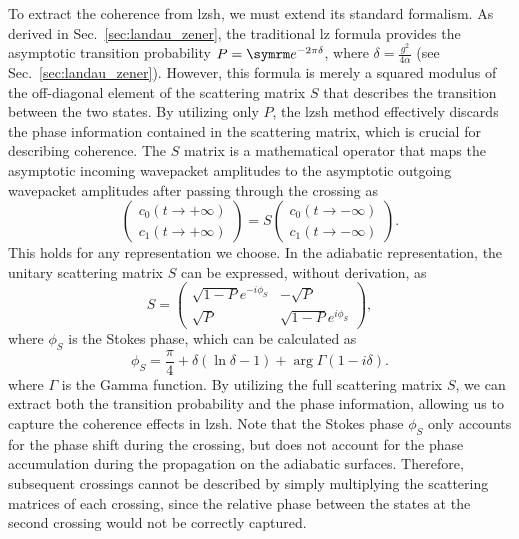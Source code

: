 To extract the coherence from \gls{lzsh}, we must extend its standard formalism. As derived in Sec.~\ref{sec:landau_zener}, the traditional \gls{lz} formula provides the asymptotic transition probability $P=\e^{-2\pi\delta}$, where $\delta=\frac{g^2}{4\alpha}$ (see Sec.~\ref{sec:landau_zener}). However, this formula is merely a squared modulus of the off-diagonal element of the scattering matrix $S$ that describes the transition between the two states. By utilizing only $P$, the \gls{lzsh} method effectively discards the phase information contained in the scattering matrix, which is crucial for describing coherence. The $S$ matrix is a mathematical operator that maps the asymptotic incoming wavepacket amplitudes to the asymptotic outgoing wavepacket amplitudes after passing through the crossing as
\begin{equation}
\begin{pmatrix}
c_0(t\to+\infty)\\
c_1(t\to+\infty)
\end{pmatrix}=S\begin{pmatrix}
c_0(t\to-\infty)\\
c_1(t\to-\infty)
\end{pmatrix}.
\end{equation}
This holds for any representation we choose. In the adiabatic representation, the unitary scattering matrix $S$ can be expressed, without derivation, as
\begin{equation}
S=\begin{pmatrix}
\sqrt{1-P}e^{-i\phi_S}&-\sqrt{P}\\
\sqrt{P}&\sqrt{1-P}e^{i\phi_S}
\end{pmatrix},
\end{equation}
where $\phi_S$ is the Stokes phase, which can be calculated as
\begin{equation}
\phi_S=\frac{\pi}{4}+\delta\left(\ln\delta-1\right)+\arg\Gamma(1-i\delta).
\end{equation}
where $\Gamma$ is the Gamma function. By utilizing the full scattering matrix $S$, we can extract both the transition probability and the phase information, allowing us to capture the coherence effects in \gls{lzsh}. Note that the Stokes phase $\phi_S$ only accounts for the phase shift during the crossing, but does not account for the phase accumulation during the propagation on the adiabatic surfaces. Therefore, subsequent crossings cannot be described by simply multiplying the scattering matrices of each crossing, since the relative phase between the states at the second crossing would not be correctly captured.

